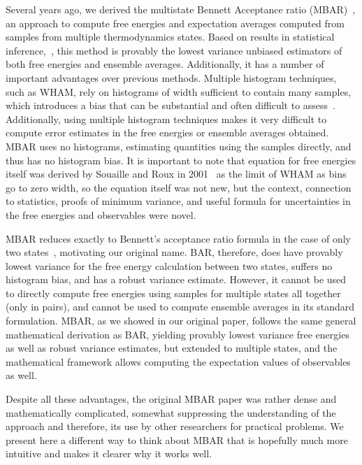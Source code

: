 \documentclass[aps,pre,twocolumn,superscriptaddress]{revtex4-1}
\begin{document}
Several years ago, we derived the multistate Bennett Acceptance ratio
(MBAR)~\cite{shirts-chodera:jcp:2008:mbar}, an approach to compute free energies and expectation averages
computed from samples from multiple thermodynamics states.  Based on
results in statistical
inference,~\cite{vardi:1985,gill:1988,kong:2003,tan:2004}, this method
is provably the lowest variance unbiased estimators of both free
energies and ensemble averages.  Additionally, it has a number of
important advantages over previous methods.  Multiple
histogram techniques, such as WHAM, rely on histograms of width
sufficient to contain many samples, which introduces a bias that can be
substantial and often difficult to
assess~\cite{kobrak:j-comput-chem:2003:histogram-error}.
Additionally, using multiple histogram techniques makes it very
difficult to compute error estimates in the free energies or ensemble
averages obtained.  MBAR uses no histograms, estimating quantities
using the samples directly, and thus has no histogram bias.  It is
important to note that equation for free energies itself was derived
by Souaille and Roux in 2001~\cite{souaille:2001a} as the limit of WHAM as
bins go to zero width, so the equation itself was not new, but the
context, connection to statistics, proofs of minimum variance, and
useful formula for uncertainties in the free energies and observables
were novel.

MBAR reduces exactly to Bennett's acceptance ratio formula in the case
of only two states~\cite{bennett:1976}, motivating our original name.
BAR, therefore, does have provably lowest variance for the free energy
calculation between two states, suffers no histogram bias, and has a
robust variance estimate.  However, it cannot be used to directly
compute free energies using samples for multiple states all together
(only in pairs), and cannot be used to compute ensemble averages in
its standard formulation.  MBAR, as we showed in our original paper,
follows the same general mathematical derivation as BAR, yielding
provably lowest variance free energies as well as robust variance
estimates, but extended to multiple states, and the mathematical
framework allows computing the expectation values of observables as
well.

Despite all these advantages, the original MBAR paper was rather dense
and mathematically complicated, somewhat suppressing the understanding
of the approach and therefore, its use by other researchers for
practical problems. We present here a different way to think about
MBAR that is hopefully much more intuitive and makes it clearer why it
works well.
\end{document}
